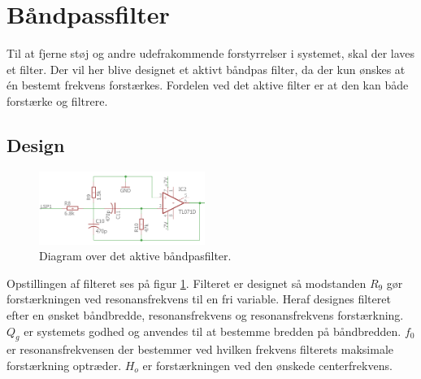 \section{Båndpassfilter}\label{sec:filter}
Til at fjerne støj og andre udefrakommende forstyrrelser i systemet, skal der laves et filter.
Der vil her blive designet et aktivt båndpas filter, da der kun ønskes at én bestemt frekvens forstærkes.
Fordelen ved det aktive filter er at den kan både forstærke og filtrere.

\subsection{Design}
\begin{figure}
	\centering
	\includegraphics[width=0.48\textwidth]{billeder/ActiveFilter.png}
	\caption{Diagram over det aktive båndpasfilter.}
	\label{fig:ActiveFilter}
\end{figure}
Opstillingen af filteret ses på figur \ref{fig:ActiveFilter}.
Filteret er designet så modstanden $R_9$ gør forstærkningen ved resonansfrekvens til en fri variable.
Heraf designes filteret efter en ønsket båndbredde, resonansfrekvens og resonansfrekvens forstærkning. $Q_g$ er systemets godhed og anvendes til at bestemme bredden på båndbredden. 
$f_0$ er resonansfrekvensen der bestemmer ved hvilken frekvens filterets maksimale forstærkning optræder.
$H_o$ er forstærkningen ved den ønskede centerfrekvens.
